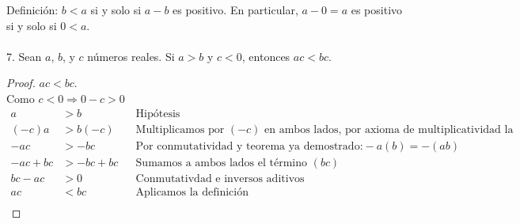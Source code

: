 \documentclass{article}
\begin{document}
Definición: \(b<a\) si y solo si \(a-b\) es positivo. En particular, \(a-0=a\) es positivo si y solo si \(0<a\).\\\\
{}
  7. Sean \(a\), \(b\), y \(c\) números reales. Si \(a>b\) y \(c<0\), entonces \(ac<bc\).\\
  \begin{proof} $ac<bc$.\\
  Como \(c<0 \Rightarrow 0-c>0\)
\begin{align*}
a &> b && \text{Hipótesis} \\
(-c)a &> b(-c) && \text{Multiplicamos por } (-c) \text{ en ambos lados, por axioma de multiplicatividad la desigualdad se mantiene} \\
-ac &> -bc && \text{Por conmutatividad y teorema ya demostrado:} -a(b) = -(ab) \\
-ac+bc &> -bc+bc && \text{Sumamos a ambos lados el término } (bc) \\
bc-ac &> 0 && \text{Conmutativdad e inversos aditivos} \\
ac &< bc && \text{Aplicamos la definición} \\
\end{align*}
\end{proof}
  
\end{document}
